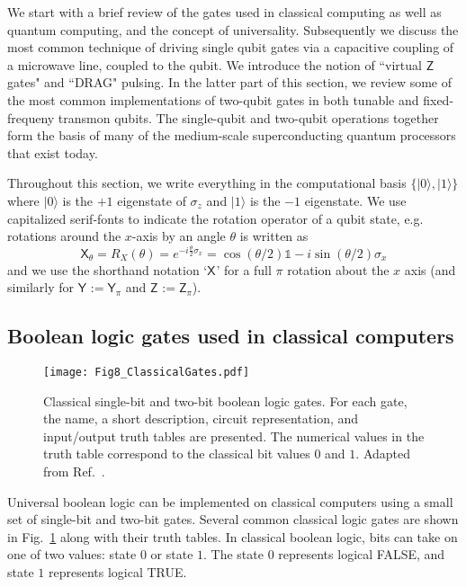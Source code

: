 \documentclass[aip,apr,twocolumn,showpacs,superscriptaddress,groupedaddress,nofootinbib,reprint]{revtex4-1}  %
\newcommand{\X}[1]{\textsf{X}_{#1}}
\newcommand{\Y}[1]{\textsf{Y}_{#1}}
\newcommand{\Z}[1]{\textsf{Z}_{#1}}
\begin{document}
We start with a brief review of the gates used in classical computing as well as quantum computing, and the concept of universality. Subsequently we discuss the most common technique of driving single qubit gates via a capacitive coupling of a microwave line, coupled to the qubit. We introduce the notion of ``virtual $\Z{}$ gates" and ``DRAG" pulsing. In the latter part of this section, we review some of the most common implementations of two-qubit gates in both tunable and fixed-frequeny transmon qubits. The single-qubit and two-qubit operations together form the basis of many of the medium-scale superconducting quantum processors that exist today.

Throughout this section, we write everything in the computational basis $\{|0\rangle,|1\rangle\}$ where $|0\rangle$ is the $+1$ eigenstate of $\sigma_z$ and $|1\rangle$ is the $-1$ eigenstate. We use capitalized serif-fonts to indicate the rotation operator of a qubit state, e.g. rotations around the $x$-axis by an angle $\theta$ is written as
\begin{equation}
 \X{\theta} = R_X(\theta) = e^{-i\frac{\theta}{2}\sigma_x} = \cos(\theta/2) \mathds{1}-i\sin(\theta/2) \sigma_x
\end{equation}
and we use the shorthand notation `$\X{}$' for a full $\pi$ rotation about the $x$ axis (and similarly for $\Y{} := \Y{\pi}$ and $\Z{} := \Z{\pi}$).

\subsection{\label{sec:ClassicalGatesInQC}Boolean logic gates used in classical computers}
\begin{figure}[!t]
\centering
\texttt{[image: Fig8\_ClassicalGates.pdf]}
\caption{Classical single-bit and two-bit boolean logic gates. For each gate, the name, a short description, circuit representation, and input/output truth tables are presented. The numerical values in the truth table correspond to the classical bit values $0$ and $1$. Adapted from Ref.~.}
\label{fig:Classical-logic-gates}
\end{figure}

Universal boolean logic can be implemented on classical computers using a small set of single-bit and two-bit gates. Several common classical logic gates are shown in Fig.~\ref{fig:Classical-logic-gates} along with their truth tables. In classical boolean logic, bits can take on one of two values: state $0$ or state $1$. The state $0$ represents logical \textsf{FALSE}, and state $1$ represents logical \textsf{TRUE}.
\end{document}
